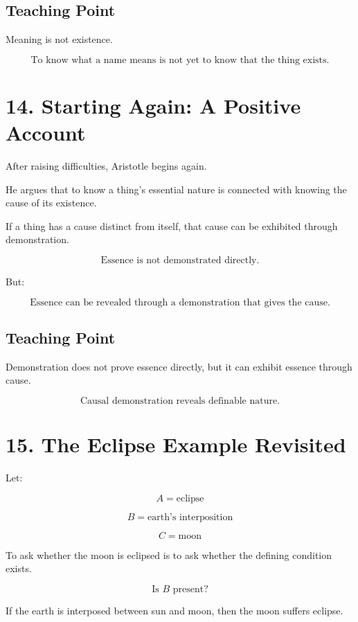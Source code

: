 \documentclass[12pt]{article}
\begin{document}
\subsection*{Teaching Point}

Meaning is not existence.

\[
\boxed{
\text{To know what a name means is not yet to know that the thing exists.}
}
\]

\section*{14. Starting Again: A Positive Account}

After raising difficulties, Aristotle begins again.

He argues that to know a thing's essential nature is connected with knowing the
cause of its existence.

If a thing has a cause distinct from itself, that cause can be exhibited through
demonstration.

\[
\text{Essence is not demonstrated directly.}
\]

But:

\[
\text{Essence can be revealed through a demonstration that gives the cause.}
\]

\subsection*{Teaching Point}

Demonstration does not prove essence directly, but it can exhibit essence
through cause.

\[
\boxed{
\text{Causal demonstration reveals definable nature.}
}
\]

\section*{15. The Eclipse Example Revisited}

Let:

\[
A = \text{eclipse}
\]

\[
B = \text{earth's interposition}
\]

\[
C = \text{moon}
\]

To ask whether the moon is eclipsed is to ask whether the defining condition
exists.

\[
\text{Is } B \text{ present?}
\]

If the earth is interposed between sun and moon, then the moon suffers eclipse.
\end{document}
